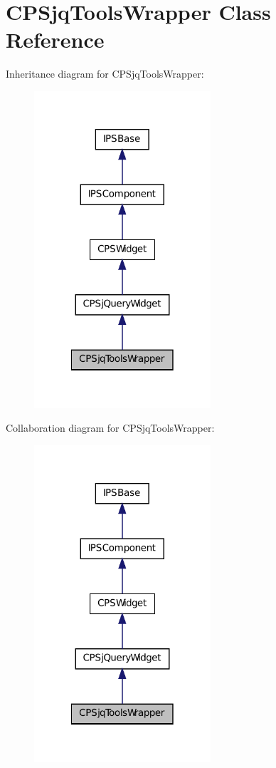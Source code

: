 \hypertarget{classCPSjqToolsWrapper}{
\section{CPSjqToolsWrapper Class Reference}
\label{classCPSjqToolsWrapper}
}


Inheritance diagram for CPSjqToolsWrapper:\nopagebreak
\begin{figure}[H]
\begin{center}
\leavevmode
\includegraphics[width=186pt]{classCPSjqToolsWrapper__inherit__graph}
\end{center}
\end{figure}


Collaboration diagram for CPSjqToolsWrapper:\nopagebreak
\begin{figure}[H]
\begin{center}
\leavevmode
\includegraphics[width=186pt]{classCPSjqToolsWrapper__coll__graph}
\end{center}
\end{figure}
